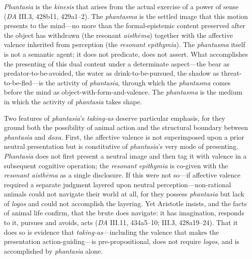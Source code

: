 \documentclass{article}
\begin{document}
\textit{Phantasia} is the \textit{kinesis} that arises from the actual exercise of a power of sense (\textit{DA} III.3, 428b11, 429a1--2). The \textit{phantasma} is the settled image that this motion presents to the mind---no more than the formal-epistemic content preserved after the object has withdrawn (the resonant \textit{aisthēma}) together with the affective valence inherited from perception (the \textit{resonant epithymia}). The \textit{phantasma} itself is not a semantic agent; it does not predicate, does not assert. What accomplishes the presenting of this dual content under a determinate aspect---the bear as predator-to-be-avoided, the water as drink-to-be-pursued, the shadow as threat-to-be-fled---is the activity of \textit{phantasia}, through which the \textit{phantasma} comes before the mind as object-with-form-and-valence. The \textit{phantasma} is the medium in which the activity of \textit{phantasia} takes shape.

Two features of \textit{phantasia}'s \textit{taking-as} deserve particular emphasis, for they ground both the possibility of animal action and the structural boundary between \textit{phantasia} and \textit{doxa}. First, the affective valence is not superimposed upon a prior neutral presentation but is constitutive of \textit{phantasia}'s very mode of presenting. \textit{Phantasia} does not first present a neutral image and then tag it with valence in a subsequent cognitive operation; the \textit{resonant epithymia} is co-given with the \textit{resonant aisthēma} as a single disclosure. If this were not so---if affective valence required a separate judgment layered upon neutral perception---non-rational animals could not navigate their world at all, for they possess \textit{phantasia} but lack of \textit{logos} and could not accomplish the layering. Yet Aristotle insists, and the facts of animal life confirm, that the brute does navigate: it has imagination, responds to it, pursues and avoids, acts (\textit{DA} III.11, 434a5--10; III.3, 428a19--24). That it does so is evidence that \textit{taking-as}---including the valence that makes the presentation action-guiding---is pre-propositional, does not require \textit{logos}, and is accomplished by \textit{phantasia} alone.
\end{document}
